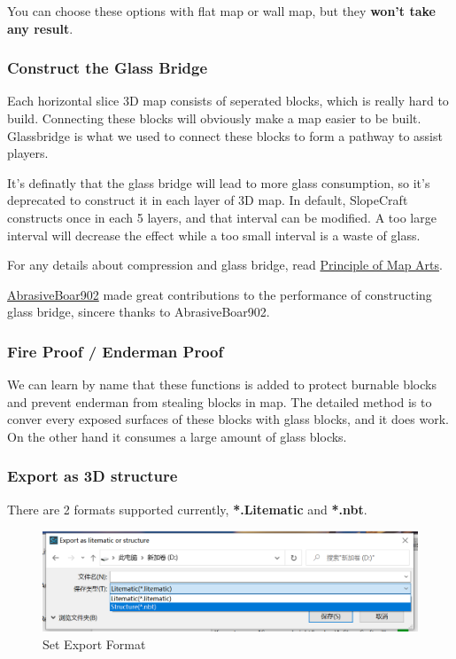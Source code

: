 \documentclass{article}
\begin{document}
You can choose these options with flat map or wall map, but they \textbf{won't take any result}.

\subsubsection{Construct the Glass Bridge}
Each horizontal slice 3D map consists of seperated blocks, which is really hard to build. Connecting these blocks will obviously make a map easier to be built. Glassbridge is what we used to connect these blocks to form a pathway to assist players.

It's definatly that the glass bridge will lead to more glass consumption, so it's deprecated to construct it in each layer of 3D map. In default, SlopeCraft constructs once in each 5 layers, and that interval can be modified. A too large interval will decrease the effect while a too small interval is a waste of glass.

For any details about compression and glass bridge, read \href{https://github.com/ToKiNoBug/SlopeCraftTutorial/blob/main/BasicPrinciple/Principle%20of%20map%20pixel%20arts.md}{Principle of Map Arts}.

\href{https://github.com/AbrasiveBoar902}{AbrasiveBoar902} made great contributions to the performance of constructing glass bridge, sincere thanks to AbrasiveBoar902.

\subsubsection{Fire Proof / Enderman Proof}
We can learn by name that these functions is added to protect burnable blocks and prevent enderman from stealing blocks in map. The detailed method is to conver every exposed surfaces of these blocks with glass blocks, and it does work. On the other hand it consumes a large amount of glass blocks.

\subsubsection{Export  as 3D structure}
There are 2 formats supported currently, \textbf{*.Litematic} and \textbf{*.nbt}.

\begin{figure}[htbp]
    \centering
    \includegraphics[width=15cm]{Img7_SelectFormat.png}
    \caption{Set Export Format}
    \label{setExport3DFormat}
\end{figure}
\end{document}
